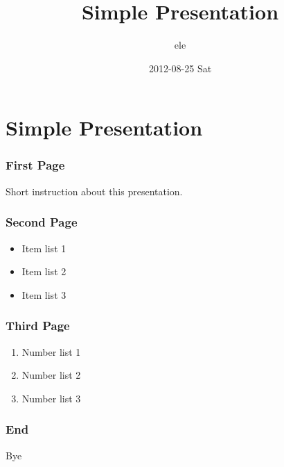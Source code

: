 \documentclass[bigger]{beamer}
\title{Simple Presentation}
\author{ele}
\date{2012-08-25 Sat}
\begin{document}
\maketitle



\section{Simple Presentation}
\label{sec-1}
\begin{frame}
\frametitle{First Page}
\label{sec-1-1}

Short instruction about this presentation.
\end{frame}
\begin{frame}
\frametitle{Second Page}
\label{sec-1-2}

\begin{itemize}
\item Item list 1
\item Item list 2
\item Item list 3
\end{itemize}
\end{frame}
\begin{frame}
\frametitle{Third Page}
\label{sec-1-3}

\begin{enumerate}
\item Number list 1
\item Number list 2
\item Number list 3
\end{enumerate}
\end{frame}
\begin{frame}
\frametitle{End}
\label{sec-1-4}

\huge Bye
\end{frame}
\end{document}
